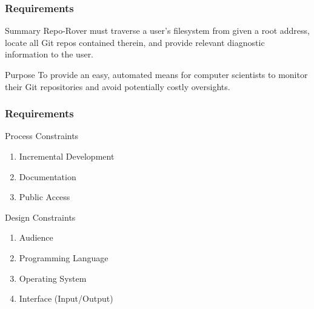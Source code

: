 \begin{frame}
	\centering
	\frametitle{Requirements}
	\begin{block}{Summary}
		Repo-Rover must traverse a user's filesystem from given a root address, locate all Git repos contained therein, and provide relevant diagnostic information to the user.
	\end{block}
	
	
		\pause
	\begin{block}{Purpose}
			To provide an easy, automated means for computer scientists to monitor their Git repositories and avoid potentially costly oversights.
	\end{block}
\end{frame}

\begin{frame}
	\centering
	\frametitle{Requirements}
	\begin{block}{Process Constraints}
		\begin{enumerate}
			\item Incremental Development
			\item Documentation
			\item Public Access
		\end{enumerate}
	\end{block}
	\pause
	\begin{block}{Design Constraints}
		\begin{enumerate}
			\item Audience
			\item Programming Language
			\item Operating System
			\item Interface (Input/Output)
		\end{enumerate}
	\end{block}
\end{frame}


